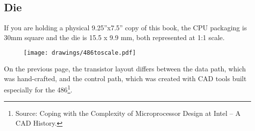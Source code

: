 \subsection{Die}
If you are holding a physical 9.25''x7.5'' copy of this book, the CPU packaging is 30mm square and the die is 15.5 x 9.9 mm, both represented at 1:1 scale.\\
\par
\bigskip

  \begin{figure}[!htb]

\begin{minipage}{0.48\textwidth}
\centering
{}
\end{minipage}
\hfill
\begin{minipage}{0.48\textwidth}
\centering
\texttt{[image: drawings/486toscale.pdf]}
\end{minipage}
\end{figure}

\par



\begin{figure}[H]
\centering
{}
\end{figure}
\par
\begin{figure}[H]
\centering
{}
\end{figure}





On the previous page, the transistor layout differs between the data path, which was hand-crafted, and the control path, which was created with CAD tools built especially for the 486\footnote{Source: Coping with the Complexity of Microprocessor Design at Intel -- A CAD History.}.\\
\par
